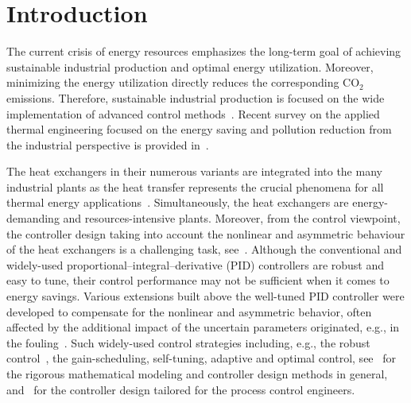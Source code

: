 \documentclass[preprint,12pt]{elsarticle}
\begin{document}
	
	\section{Introduction}
	\label{sec:introduction}
	
	
	
	The current crisis of energy resources emphasizes the long-term goal of achieving sustainable industrial production and optimal energy utilization. Moreover, minimizing the energy utilization directly reduces the corresponding CO$_{2}$ emissions. Therefore, sustainable industrial production is focused on the wide implementation of advanced control methods~\cite{MN20}. Recent survey on the applied thermal engineering focused on the energy saving and pollution reduction from the industrial perspective is provided in~\cite{YV16}.
	
	The heat exchangers in their numerous variants are integrated into the many industrial plants as the heat transfer represents the crucial phenomena for all thermal energy applications~\cite{KV18}. Simultaneously, the heat exchangers are energy-demanding and resources-intensive plants. Moreover, from the control viewpoint, the controller design taking into account the nonlinear and asymmetric behaviour of the heat exchangers is a challenging task, see~\cite{RL20}. Although the conventional and widely-used proportional–integral–derivative (PID) controllers are robust and easy to tune, their control performance may not be sufficient when it comes to energy savings. Various extensions built above the well-tuned PID controller were developed to compensate for the nonlinear and asymmetric behavior, often affected by the additional impact of the uncertain parameters originated, e.g., in the fouling~\cite{MT19}. Such widely-used control strategies including, e.g., the robust control~\cite{WY18}, the gain-scheduling, self-tuning, adaptive and optimal control, see~\cite{MF08} for the rigorous mathematical modeling and controller design methods in general, and~\cite{Liptak} for the controller design tailored for the process control engineers. 
	
\end{document}
